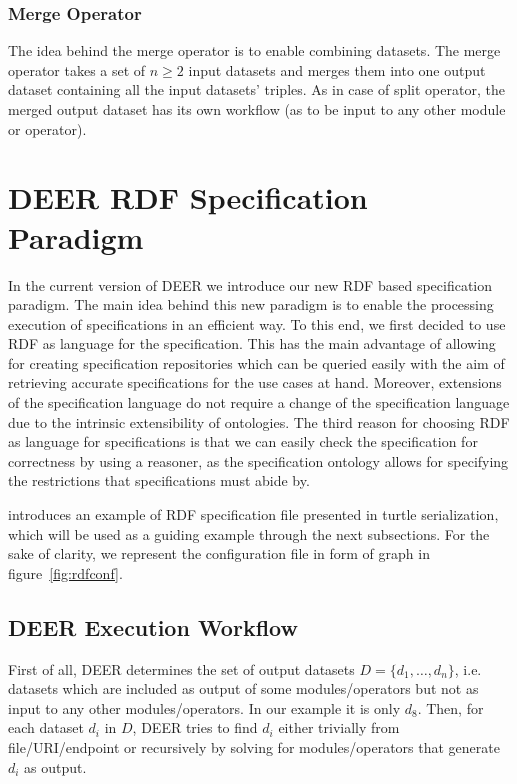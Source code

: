 \documentclass[a4paper,twoside,bibtotoc,abstracton,12pt,BCOR=15mm]{article}
\newcommand{\geolift}{\textsc{DEER}\xspace}
\begin{document}
\subsubsection{Merge Operator}
The idea behind the merge operator is to enable combining datasets.
The merge operator takes a set of $n \geq 2$ input datasets and merges them into one output dataset containing all the input datasets' triples.
As in case of split operator, the merged output dataset has its own workflow (as to be input to any other module or operator).

\section{\geolift RDF Specification Paradigm}
In the current version of \geolift we introduce our new RDF based specification paradigm.
The main idea behind this new paradigm is to enable the processing execution of specifications in an efficient way.
To this end, we first decided to use RDF as language for the specification. This has the main advantage of allowing for creating specification repositories which can be queried easily with the aim of retrieving accurate specifications for the use cases at hand. Moreover, extensions of the specification language do not require a change of the specification language due to the intrinsic extensibility of ontologies. The third reason for choosing RDF as language for specifications is that we can easily check the specification for correctness by using a reasoner, as the specification ontology allows for specifying the restrictions that specifications must abide by.

introduces an example of RDF specification file presented in turtle serialization, which will be used as a guiding example through the next subsections.
For the sake of  clarity, we represent the configuration file in form of graph in figure~\ref{fig:rdfconf}.


\subsection{\geolift Execution Workflow}
First of all, \geolift determines the set of output datasets $D = \{d_1, \dots , d_n\}$, 
i.e. datasets which are included as output of some modules/operators but not as input to any other modules/operators.
In our example it is only $d_8$.
Then, for each dataset $d_i$ in $D$, \geolift tries to find $d_i$ either trivially from file/URI/endpoint or recursively by solving for modules/operators that generate $d_i$ as output.
\end{document}
